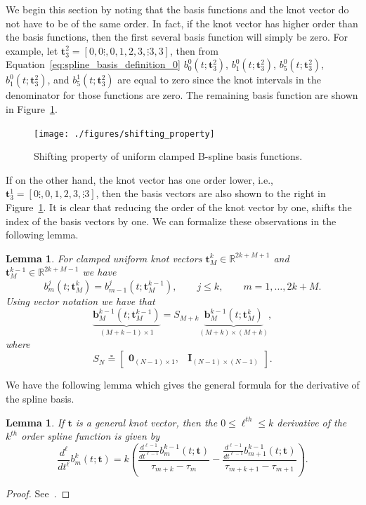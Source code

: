 \documentclass{article}
\newtheorem{lemma}[theorem]{Lemma}
\newcommand{\defeq}{\circeq}
\newcommand{\bbf}{\mathbf{b}}
\begin{document}
We begin this section by noting that the basis functions and the knot vector do not have to be of the same order.  In fact, if the knot vector has higher order than the basis functions, then the first several basis function will simply be zero.  
For example, let $\mathbf{t}_3^2 = [0, 0\vdots, 0, 1, 2, 3, \vdots 3, 3]$, then from Equation~\eqref{eq:spline_basis_definition_0} $b_0^0(t; \mathbf{t}_3^2)$, $b_1^0(t; \mathbf{t}_3^2)$, $b_5^0(t; \mathbf{t}_3^2)$, $b_1^0(t; \mathbf{t}_3^2)$, and $b_5^1(t; \mathbf{t}_3^2)$ are equal to zero since the knot intervals in the denominator for those functions are zero.  The remaining basis function are shown in Figure~\ref{fig:shifting_property}.
\begin{figure}[hbt]
  \centering\texttt{[image: ./figures/shifting\_property]}
  \caption{Shifting property of uniform clamped B-spline basis functions.}
  \label{fig:shifting_property}  
\end{figure}
If on the other hand, the knot vector has one order lower, i.e., $\mathbf{t}_3^1 = [0\vdots, 0, 1, 2, 3, \vdots 3]$, then the basis vectors are also shown to the right in Figure~\ref{fig:shifting_property}.  It is clear that reducing the order of the knot vector by one, shifts the index of the basis vectors by one.  We can formalize these observations in the following lemma.
\begin{lemma} \label{lem:shifting_property}
For clamped uniform knot vectors $\mathbf{t}_M^k \in \mathbb{R}^{2k+M+1}$ and $\mathbf{t}_M^{k-1}\in\mathbb{R}^{2k+M-1}$ we have
\[
b_m^j(t; \mathbf{t}_M^k) = b_{m-1}^j(t; \mathbf{t}_M^{k-1}), \qquad j \leq k, \qquad m = 1, \dots, 2k+M.
\]	
Using vector notation we have that
\[
\underbrace{\bbf_M^{k-1}(t; \mathbf{t}_M^{k-1})}_{(M+k-1)\times 1} = S_{M+k} \underbrace{\bbf_M^{k-1}(t; \mathbf{t}_M^k)}_{(M+k)\times(M+k)},
\]
where
\[
	S_{N} \defeq \begin{bmatrix} \mathbf{0}_{(N-1)\times 1}, & \mathbf{I}_{(N-1) \times (N-1)} \end{bmatrix}.
\]
\end{lemma}

We have the following lemma which gives the general formula for the derivative of the spline basis.
\begin{lemma}\label{lem:derivative_basis_functions}
If $\mathbf{t}$ is a general knot vector, then the $0\leq \ell^{th} \leq k$ derivative of the $k^{th}$ order spline function is given by
\[
\frac{d^\ell}{dt^\ell}b_m^k(t; \mathbf{t}) = k\left(\frac{\frac{d^{\ell-1}}{dt^{\ell-1}}b_m^{k-1}(t; \mathbf{t})}{\tau_{m+k}-\tau_m} - \frac{\frac{d^{\ell-1}}{dt^{\ell-1}}b_{m+1}^{k-1}(t; \mathbf{t})}{\tau_{m+k+1}-\tau_{m+1}} \right).
\]	
\end{lemma}
\begin{proof}
See~\cite{PieglTiller95}.
\end{proof}
\end{document}

